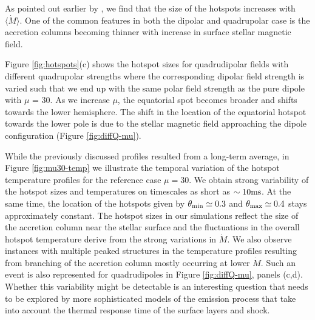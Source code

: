 \documentclass[fleqn,usenatbib]{mnras}
\newcommand{\rstar}{\ensuremath{R_{\star}}}
\begin{document}
As pointed out earlier by \cite{Romanova2004}, we find that the size of the hotspots increases with $\langle \dot{M} \rangle$. One of the common features in both the dipolar and quadrupolar case is the accretion columns becoming thinner with increase in surface stellar magnetic field.

Figure \ref{fig:hotspots}(c) shows the hotspot sizes for quadrudipolar fields with different quadrupolar strengths where the corresponding dipolar field strength is varied such that we end up with the same polar field strength as the pure dipole with $\mu$ = 30. As we increase $\mu$, the equatorial spot becomes broader and shifts towards the lower hemisphere. The shift in the location of the equatorial hotspot towards the lower pole is due to the stellar magnetic field approaching the dipole configuration (Figure \ref{fig:diffQ-mu}). 

\begin{figure*}
\centering
{}%
\caption{Temperature profiles at the stellar surface averaged over 1200$r_g/c$ ($\approx$10ms for a typical \rstar = 10 km) for 8 consecutive time windows, for a dipolar field with $\mu$ = 30. The black dashed curve represents the  averaged temperature profile(same as Figure \ref{fig:hotspots} shown for reference). The color gradient shows the temporal progression of the averaged temperature profiles within t $\in$ [20400,30000]$r_g/c \approx$ 80ms.}
\label{fig:mu30-temp}
\end{figure*}

While the previously discussed profiles resulted from a long-term average, in Figure \ref{fig:mu30-temp} we illustrate the temporal variation of the hotspot temperature profiles for the reference case $\mu = 30$. We obtain strong variability of the hotspot sizes and temperatures on timescales as short as $\sim 10\rm ms$.  At the same time, the location of the hotspots given by $\theta_{\rm min}\simeq0.3$ and $\theta_{\rm max}\simeq0.4$ stays approximately constant.  The hotspot sizes in our simulations reflect the size of the accretion column near the stellar surface and the fluctuations in the overall hotspot temperature derive from the strong variations in $\dot{M}$. We also observe instances with multiple peaked structures in the temperature profiles resulting from branching of the accretion column mostly occurring at lower $\dot{M}$.  Such an event is also represented for quadrudipoles in Figure \ref{fig:diffQ-mu}, panels (c,d).  
Whether this variability might be detectable is an interesting question that needs to be explored by more sophisticated models of the emission process that take into account the thermal response time of the surface layers and shock. 
\end{document}
